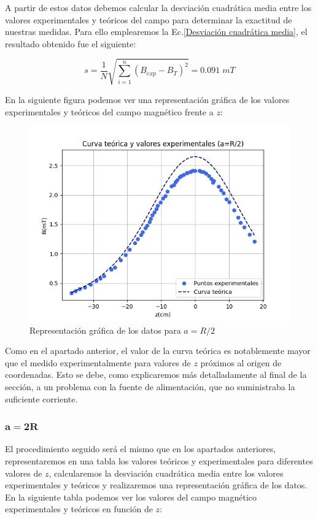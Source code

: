 \documentclass[a4paper,12pt,titlepage]{report}
\begin{document}
\newpage

A partir de estos datos debemos calcular la desviación cuadrática media entre los valores experimentales y teóricos del campo para determinar la exactitud de nuestras medidas. Para ello emplearemos la Ec.\ref{Desviación cuadrática media}, el resultado obtenido fue el siguiente:

\begin{equation}
    s = \frac{1}{N} \sqrt{\sum_{i=1}^{n} (B_{exp} - B_T)^2} = 0.091 \; mT
\end{equation}

En la siguiente figura podemos ver una representación gráfica de los valores experimentales y teóricos del campo magnético frente a $z$:

\begin{figure}[h!]
    \centering
    \includegraphics[width=0.85\linewidth]{Images/CurvaB2.png}
    \caption{Representación gráfica de los datos para $a=R/2$}
\end{figure}

Como en el apartado anterior, el valor de la curva teórica es notablemente mayor que el medido experimentalmente para valores de $z$ próximos al origen de coordenadas. Esto se debe, como explicaremos más detalladamente al final de la sección, a un problema con la fuente de alimentación, que no suministraba la suficiente corriente.

\subsubsection{$\mathbf{a=2R}$}

El procedimiento seguido será el mismo que en los apartados anteriores, representaremos en una tabla los valores teóricos y experimentales para diferentes valores de $z$, calcularemos la desviación cuadrática media entre los valores experimentales y teóricos y realizaremos una representación gráfica de los datos. En la siguiente tabla podemos ver los valores del campo magnético experimentales y teóricos en función de $z$:
\end{document}
